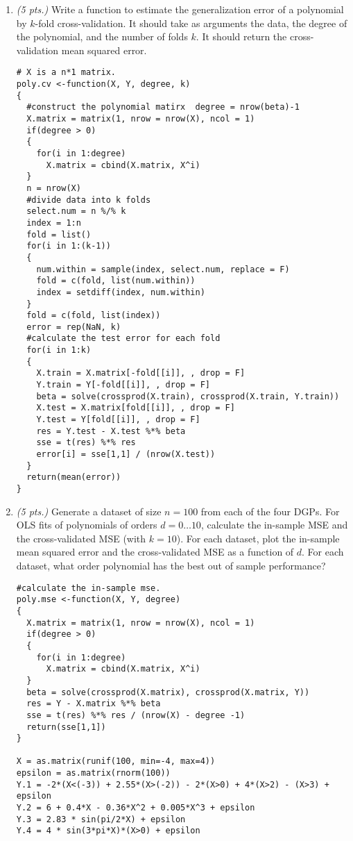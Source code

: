 \documentclass[11pt,english]{article}
\begin{document}
  \begin{enumerate}
  \item \textit{(5 pts.)} Write a function to estimate the generalization error of a polynomial by $k$-fold cross-validation. It should take as arguments the data, the degree of the polynomial, and the number of folds $k$. It should return the cross-validation mean squared error.

\begin{verbatim}
# X is a n*1 matrix.
poly.cv <-function(X, Y, degree, k)
{
  #construct the polynomial matirx  degree = nrow(beta)-1
  X.matrix = matrix(1, nrow = nrow(X), ncol = 1)
  if(degree > 0)
  {
    for(i in 1:degree)
      X.matrix = cbind(X.matrix, X^i)
  }
  n = nrow(X)
  #divide data into k folds
  select.num = n %/% k
  index = 1:n
  fold = list()
  for(i in 1:(k-1))
  {
    num.within = sample(index, select.num, replace = F)
    fold = c(fold, list(num.within))
    index = setdiff(index, num.within)
  }
  fold = c(fold, list(index))
  error = rep(NaN, k)
  #calculate the test error for each fold
  for(i in 1:k)
  {
    X.train = X.matrix[-fold[[i]], , drop = F]
    Y.train = Y[-fold[[i]], , drop = F]
    beta = solve(crossprod(X.train), crossprod(X.train, Y.train))
    X.test = X.matrix[fold[[i]], , drop = F]
    Y.test = Y[fold[[i]], , drop = F]
    res = Y.test - X.test %*% beta
    sse = t(res) %*% res
    error[i] = sse[1,1] / (nrow(X.test))
  }
  return(mean(error))
}
\end{verbatim}

   \item \textit{(5 pts.)} Generate a dataset of size $n = 100$ from each of the four DGPs. For  OLS fits of polynomials of orders $d = 0 \ldots 10$, calculate the in-sample MSE and the cross-validated MSE (with  $k=10$). For each dataset, plot the in-sample mean squared error and the cross-validated MSE as a function of $d$. For each dataset, what order polynomial has the best out of sample performance?

\begin{verbatim}
#calculate the in-sample mse.
poly.mse <-function(X, Y, degree)
{
  X.matrix = matrix(1, nrow = nrow(X), ncol = 1)
  if(degree > 0)
  {
    for(i in 1:degree)
      X.matrix = cbind(X.matrix, X^i)
  }
  beta = solve(crossprod(X.matrix), crossprod(X.matrix, Y))
  res = Y - X.matrix %*% beta
  sse = t(res) %*% res / (nrow(X) - degree -1)
  return(sse[1,1])
}

X = as.matrix(runif(100, min=-4, max=4))
epsilon = as.matrix(rnorm(100))
Y.1 = -2*(X<(-3)) + 2.55*(X>(-2)) - 2*(X>0) + 4*(X>2) - (X>3) + epsilon
Y.2 = 6 + 0.4*X - 0.36*X^2 + 0.005*X^3 + epsilon
Y.3 = 2.83 * sin(pi/2*X) + epsilon
Y.4 = 4 * sin(3*pi*X)*(X>0) + epsilon


\end{verbatim}
\end{enumerate}
\end{document}
